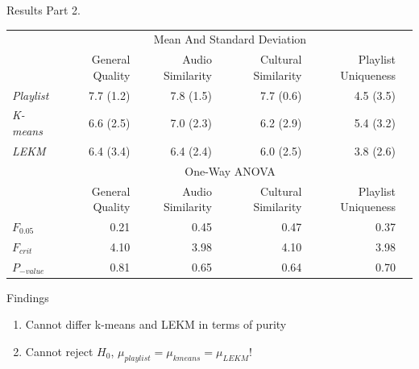 \documentclass[aspectratio=1610]{beamer}
\begin{document}
\begin{frame}{Results Part 2.}
\begin{table}[H]
\begin{adjustbox}{width=\textwidth, totalheight=\baselineskip,keepaspectratio}
\begin{tabular}{l@{\hspace{0.2in}}rrrrr}
  \hline\noalign{\smallskip}
  \multicolumn{1}{l}{} & \multicolumn{4}{c}{Mean And Standard Deviation}\\
  \noalign{\smallskip}\cline{2-5}\noalign{\smallskip}
  \multicolumn{1}{l}{Source} & General Quality & Audio Similarity & Cultural Similarity & Playlist Uniqueness
  \\
\noalign{\smallskip}
  \hline
  \noalign{\smallskip}
  \textit{Playlist} & 7.7 (1.2)	&   7.8	(1.5)    &   7.7 (0.6)	&   4.5	(3.5) \\
  \noalign{\smallskip}
  \hline
  \noalign{\smallskip}
  \textit{K-means} & 6.6 (2.5)	&   7.0	(2.3)    &   6.2 (2.9)	&   5.4	(3.2) \\
  \textit{LEKM} & 6.4 (3.4)	&   6.4	(2.4)    &   6.0 (2.5)	&   3.8	(2.6) \\
  \noalign{\smallskip}
  \hline
  \noalign{\smallskip}
  \multicolumn{1}{l}{} & \multicolumn{4}{c}{One-Way ANOVA}\\
  \noalign{\smallskip}\cline{2-5}\noalign{\smallskip}
  \multicolumn{1}{l}{Index} & General Quality & Audio Similarity & Cultural Similarity & Playlist Uniqueness\\
  \hline
  $F_{0.05}$    & 0.21 &    0.45    &   0.47	&   0.37 \\
  $F_{crit}$    & 4.10 &    3.98    &   4.10	&   3.98 \\
  $P_{-value}$   & 0.81 &    0.65    &   0.64	&   0.70 \\
  \hline
\end{tabular}
\end{adjustbox}
\end{table}
\end{frame}

\begin{frame}{Findings}
  \begin{enumerate}
    \item Cannot differ k-means and LEKM in terms of purity
    \item Cannot reject $H_{0}$, $\mu_{playlist} = \mu_{kmeans} = \mu_{LEKM}$!
  \end{enumerate}
\end{frame}
\end{document}

